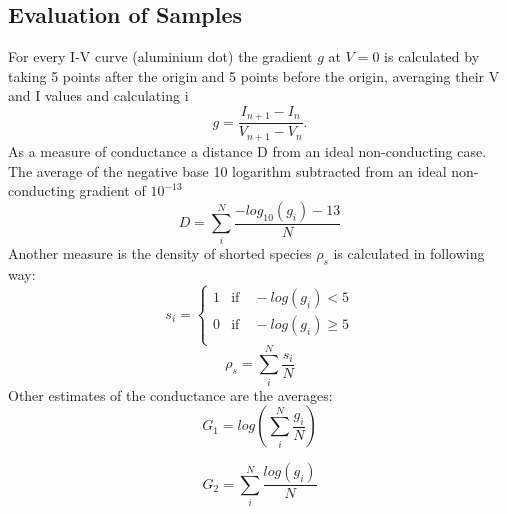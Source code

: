\documentclass[a4paper]{article}
\begin{document}
\subsection{Evaluation of Samples}
\label{sec:eval}
For every I-V curve (aluminium dot) the gradient $g$ at $V=0$ is calculated by taking 5 points after the origin and 5 points before the origin, averaging their V and I values and calculating i
\begin{equation}
	g = \frac{I_{n+1} - I_n}{V_{n+1} - V_n}.
\end{equation}
As a measure of conductance a distance D from an ideal non-conducting case. The average of the negative base 10 logarithm subtracted from an ideal non-conducting gradient of $10^{-13}$ 
\begin{equation}
	D = \sum_i^N \frac{ -log_{10}(g_i) - 13}{N}
	\label{eq:D}
\end{equation}
Another measure is the density of shorted species $\rho_{s}$ is calculated in following way:
\begin{equation}
	s_i = \begin{cases}
	1 &\text{if} \quad -log(g_i) < 5 \\
	0 &\text{if} \quad -log(g_i) \geq 5 \\
	\end{cases}
\end{equation}
\begin{equation}
	\rho_s = \sum_i^N \frac{s_i}{N}
	\label{eq:rho}
\end{equation}
Other estimates of the conductance are the averages:
\begin{equation}
	G_1 = log \left( \sum_i^N \frac{g_i}{N} \right)
\end{equation}

\begin{equation}
	G_2 =  \sum_i^N \frac{log(g_i)}{N}
\end{equation}
\end{document}
